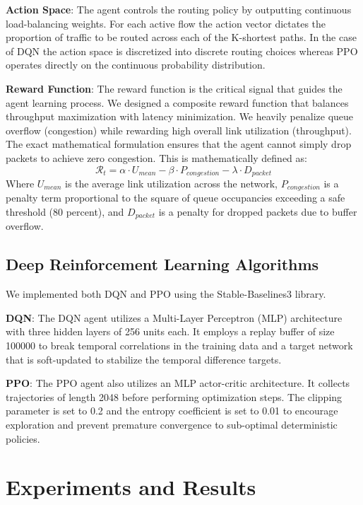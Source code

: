 \documentclass[10pt,twocolumn,letterpaper]{article}
\begin{document}
\textbf{Action Space}: The agent controls the routing policy by outputting continuous load-balancing weights. For each active flow the action vector dictates the proportion of traffic to be routed across each of the K-shortest paths. In the case of DQN the action space is discretized into discrete routing choices whereas PPO operates directly on the continuous probability distribution.

\textbf{Reward Function}: The reward function is the critical signal that guides the agent learning process. We designed a composite reward function that balances throughput maximization with latency minimization. We heavily penalize queue overflow (congestion) while rewarding high overall link utilization (throughput). The exact mathematical formulation ensures that the agent cannot simply drop packets to achieve zero congestion. This is mathematically defined as:
\begin{equation}
\mathcal{R}_t = \alpha \cdot U_{mean} - \beta \cdot P_{congestion} - \lambda \cdot D_{packet}
\end{equation}
Where $U_{mean}$ is the average link utilization across the network, $P_{congestion}$ is a penalty term proportional to the square of queue occupancies exceeding a safe threshold (80 percent), and $D_{packet}$ is a penalty for dropped packets due to buffer overflow.

\subsection{Deep Reinforcement Learning Algorithms}
We implemented both DQN and PPO using the Stable-Baselines3 library.

\textbf{DQN}: The DQN agent utilizes a Multi-Layer Perceptron (MLP) architecture with three hidden layers of 256 units each. It employs a replay buffer of size 100000 to break temporal correlations in the training data and a target network that is soft-updated to stabilize the temporal difference targets.

\textbf{PPO}: The PPO agent also utilizes an MLP actor-critic architecture. It collects trajectories of length 2048 before performing optimization steps. The clipping parameter is set to 0.2 and the entropy coefficient is set to 0.01 to encourage exploration and prevent premature convergence to sub-optimal deterministic policies.

\section{Experiments and Results}
\end{document}
